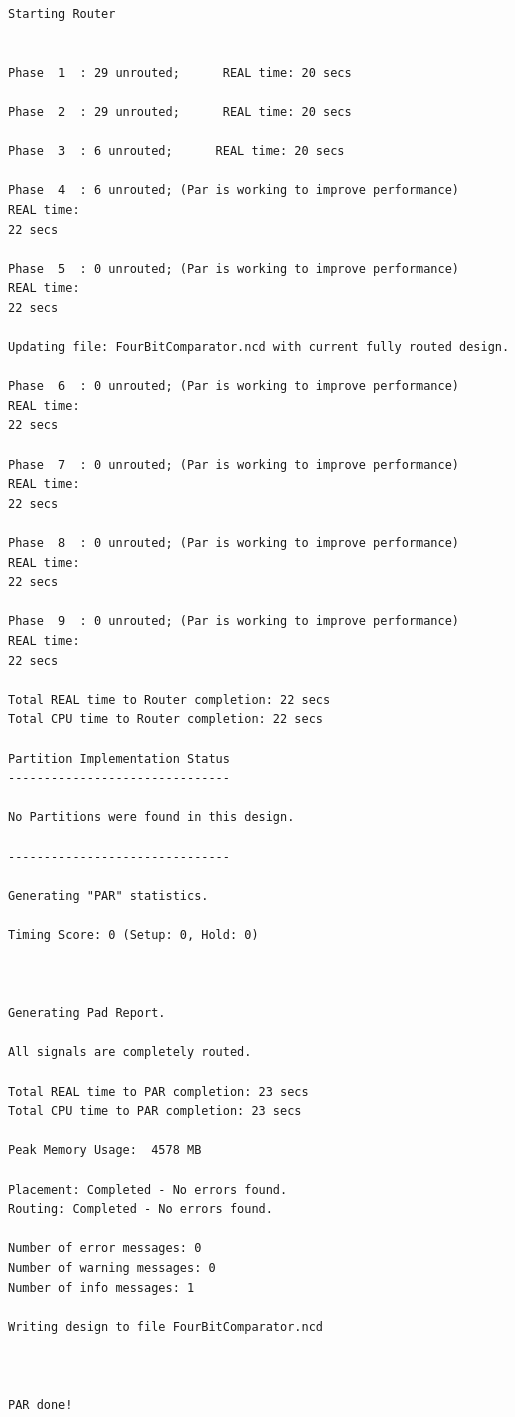 \documentclass[fleqn]{article}
\begin{document}
\begin{latin}
\begin{lstlisting}[basicstyle=\tiny]
Starting Router


Phase  1  : 29 unrouted;      REAL time: 20 secs 

Phase  2  : 29 unrouted;      REAL time: 20 secs 

Phase  3  : 6 unrouted;      REAL time: 20 secs 

Phase  4  : 6 unrouted; (Par is working to improve performance)     REAL time: 
22 secs 

Phase  5  : 0 unrouted; (Par is working to improve performance)     REAL time: 
22 secs 

Updating file: FourBitComparator.ncd with current fully routed design.

Phase  6  : 0 unrouted; (Par is working to improve performance)     REAL time: 
22 secs 

Phase  7  : 0 unrouted; (Par is working to improve performance)     REAL time: 
22 secs 

Phase  8  : 0 unrouted; (Par is working to improve performance)     REAL time: 
22 secs 

Phase  9  : 0 unrouted; (Par is working to improve performance)     REAL time: 
22 secs 

Total REAL time to Router completion: 22 secs 
Total CPU time to Router completion: 22 secs 

Partition Implementation Status
-------------------------------

No Partitions were found in this design.

-------------------------------

Generating "PAR" statistics.

Timing Score: 0 (Setup: 0, Hold: 0)



Generating Pad Report.

All signals are completely routed.

Total REAL time to PAR completion: 23 secs 
Total CPU time to PAR completion: 23 secs 

Peak Memory Usage:  4578 MB

Placement: Completed - No errors found.
Routing: Completed - No errors found.

Number of error messages: 0
Number of warning messages: 0
Number of info messages: 1

Writing design to file FourBitComparator.ncd



PAR done!
\end{lstlisting}
\end{latin}
\end{document}
